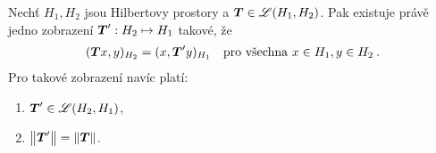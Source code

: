 \begin{theorem}
Nechť $H_1, H_2$ jsou Hilbertovy prostory a $\boldsymbol{T} \in \mathscr{L}(H_1, H_2)$. Pak existuje právě jedno zobrazení $\boldsymbol{T}' : H_2 \mapsto H_1$ takové, že 
\begin{align} \label{eq4.dualHilbert}
    (\boldsymbol{T} x, y)_{H_2} = (x, \boldsymbol{T}'y)_{H_1} \quad \text{pro všechna } x \in H_1, y \in H_2 \:.
\end{align}
Pro takové zobrazení navíc platí: \begin{enumerate}
    \item $\boldsymbol{T}' \in \mathscr{L}(H_2, H_1)$,
    \item $\left\lVert\boldsymbol{T}'\right\rVert = \left\lVert\boldsymbol{T}\right\rVert$.
\end{enumerate}
\end{theorem}


